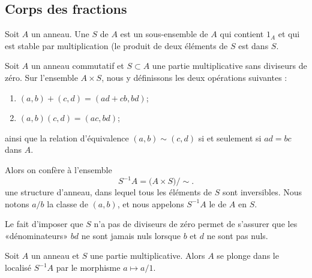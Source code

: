 \subsection{Corps des fractions}

\begin{definition}
  Soit \( A \) un anneau. Une  \( S \) de \( A \) est un sous-ensemble de \( A \) qui contient \( 1_A \) et qui est stable par multiplication (le produit de deux éléments de \( S \) est dans \( S \).
\end{definition}

\begin{propositionDef}       \label{DEFLocaliseDunAnneau}
    Soit \( A\) un anneau commutatif et \( S \subset A \) une partie multiplicative sans diviseurs de zéro. Sur l'ensemble \( A\times S\), nous y définissons les deux opérations suivantes :
    \begin{enumerate}
        \item
            \( (a,b)+(c,d)=(ad+cb,bd)\);
        \item
            \( (a,b)(c,d)=(ac,bd)\);
    \end{enumerate}
    ainsi que la relation d'équivalence \( (a,b)\sim(c,d)\) si et seulement si \( ad=bc\) dans \( A \).

    Alors on confère à l'ensemble
    \begin{equation}
        S^{-1}A=\big( A\times S \big)/\sim.
    \end{equation}
    une structure d'anneau, dans lequel tous les éléments de \( S \) sont inversibles. Nous notons \( a/b\) la classe de \( (a,b)\), et nous appelons \(S^{-1}A\) le  de \( A \) en \( S \).
\end{propositionDef}

Le fait d'imposer que \( S \) n'a pas de diviseurs de zéro permet de s'assurer que les «dénominateurs» \( bd \) ne sont jamais nuls lorsque \( b \) et \( d \) ne sont pas nuls.

\begin{proposition}
  Soit \( A \) un anneau et \(S \) une partie multiplicative. Alors \( A \) se plonge dans le localisé \( S^{-1}A \) par le morphisme \( a \mapsto a/1 \).
\end{proposition}

